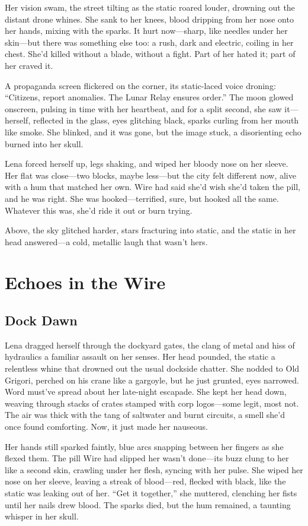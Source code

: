 \documentclass[12pt]{book}
\begin{document}
Her vision swam, the street tilting as the static roared louder, drowning out the distant drone whines. She sank to her knees, blood dripping from her nose onto her hands, mixing with the sparks. It hurt now---sharp, like needles under her skin---but there was something else too: a rush, dark and electric, coiling in her chest. She’d killed without a blade, without a fight. Part of her hated it; part of her craved it.

A propaganda screen flickered on the corner, its static-laced voice droning: ``Citizens, report anomalies. The Lunar Relay ensures order.'' The moon glowed onscreen, pulsing in time with her heartbeat, and for a split second, she saw it---herself, reflected in the glass, eyes glitching black, sparks curling from her mouth like smoke. She blinked, and it was gone, but the image stuck, a disorienting echo burned into her skull.

Lena forced herself up, legs shaking, and wiped her bloody nose on her sleeve. Her flat was close---two blocks, maybe less---but the city felt different now, alive with a hum that matched her own. Wire had said she’d wish she’d taken the pill, and he was right. She was hooked---terrified, sure, but hooked all the same. Whatever this was, she’d ride it out or burn trying.

Above, the sky glitched harder, stars fracturing into static, and the static in her head answered---a cold, metallic laugh that wasn’t hers.

\chapter{Echoes in the Wire}
\section{Dock Dawn}

Lena dragged herself through the dockyard gates, the clang of metal and hiss of hydraulics a familiar assault on her senses. Her head pounded, the static a relentless whine that drowned out the usual dockside chatter. She nodded to Old Grigori, perched on his crane like a gargoyle, but he just grunted, eyes narrowed. Word must've spread about her late-night escapade. She kept her head down, weaving through stacks of crates stamped with corp logos---some legit, most not. The air was thick with the tang of saltwater and burnt circuits, a smell she'd once found comforting. Now, it just made her nauseous.

Her hands still sparked faintly, blue arcs snapping between her fingers as she flexed them. The pill Wire had slipped her wasn't done---its buzz clung to her like a second skin, crawling under her flesh, syncing with her pulse. She wiped her nose on her sleeve, leaving a streak of blood---red, flecked with black, like the static was leaking out of her. ``Get it together,'' she muttered, clenching her fists until her nails drew blood. The sparks died, but the hum remained, a taunting whisper in her skull.
\end{document}
